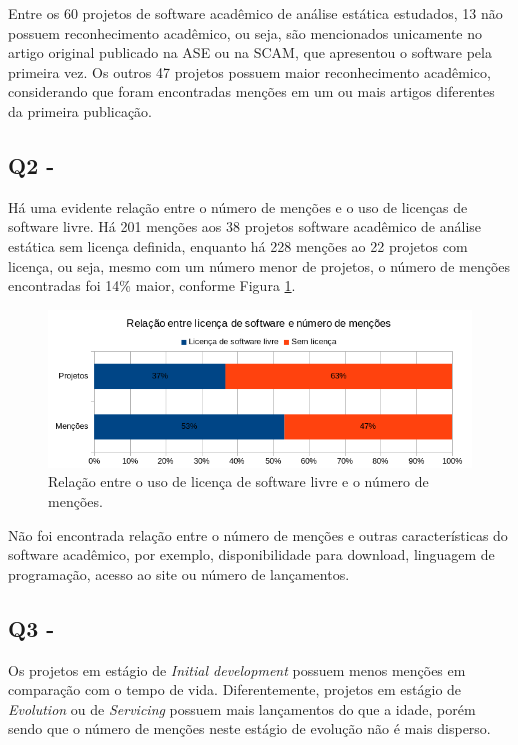 Entre os 60 projetos de software acadêmico de análise estática estudados, 
13 não possuem reconhecimento acadêmico, ou seja, são
mencionados unicamente no artigo original publicado na ASE ou na SCAM,
que apresentou o software pela primeira vez. 
Os outros 47 projetos possuem maior reconhecimento acadêmico, 
considerando que foram encontradas menções em um ou mais artigos
diferentes da primeira publicação.


\subsection{Q2 - \QuestaoDois} %

Há uma evidente relação entre o número de menções e o uso de licenças de
software livre. 
Há 201 menções aos 38 projetos software acadêmico de análise estática sem licença definida, 
enquanto há 228 menções ao 22 projetos com licença, ou seja, 
mesmo com um número menor de projetos, o número de menções encontradas foi 14\% maior, 
conforme Figura \ref{license-vs-mentions}.

\begin{figure}[ht]
  \center
  \includegraphics[scale=0.6]{imagens/license-vs-mentions.png}
  \caption{Relação entre o uso de licença de software livre e o número de menções.}
  \label{license-vs-mentions}
\end{figure}

Não foi encontrada relação entre o número de menções e 
outras características do software acadêmico, por exemplo,
disponibilidade para download, linguagem de programação, acesso ao site ou número
de lançamentos.

\subsection{Q3 - \QuestaoTres} %

Os projetos em estágio de {\it Initial development} possuem menos menções em %
comparação com o tempo de vida. 
Diferentemente, projetos em estágio de {\it Evolution} ou de {\it Servicing} 
possuem mais lançamentos do que a idade, porém
sendo que o número de menções neste estágio de evolução não é mais disperso. %

